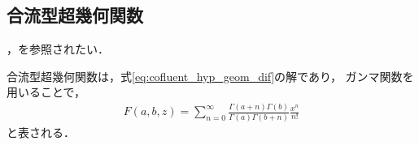 \documentclass[a4paper,11pt]{ltjsarticle}
\begin{document}
\subsection{合流型超幾何関数}
\cite{BN01957611}，\cite{igi_kawai1994}を参照されたい．

合流型超幾何関数は，式\ref{eq:cofluent_hyp_geom_dif}の解であり，
ガンマ関数を用いることで，
\begin{align}\label{eq:expansion_cofluent_hyp}
  F(a,b,z) = \sum_{n=0}^{\infty} \frac{\Gamma(a+n)\Gamma(b)}{\Gamma(a)\Gamma(b+n)} \frac{x^n}{n!}
\end{align}
と表される．
\newpage
% 
% 
\printbibliography%
\end{document}
